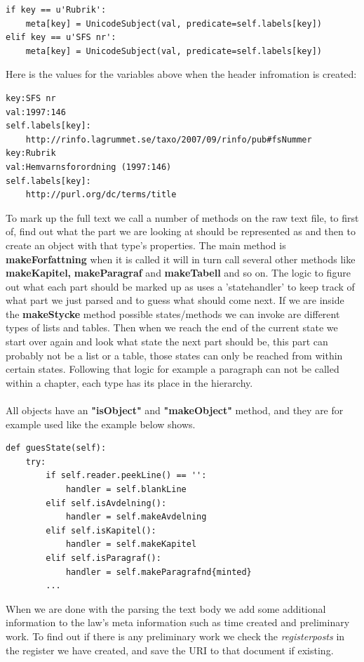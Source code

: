 \begin{verbatim}
if key == u'Rubrik':
	meta[key] = UnicodeSubject(val, predicate=self.labels[key])
elif key == u'SFS nr':
	meta[key] = UnicodeSubject(val, predicate=self.labels[key])
\end{verbatim} 
\linebreak
\newline
Here is the values for the variables above when the header infromation is created:\\
\begin{verbatim}
key:SFS nr
val:1997:146
self.labels[key]:
	http://rinfo.lagrummet.se/taxo/2007/09/rinfo/pub#fsNummer
key:Rubrik
val:Hemvarnsforordning (1997:146)
self.labels[key]:
	http://purl.org/dc/terms/title
\end{verbatim}
\linebreak
\newline
To mark up the full text we call a number of methods on the raw text file, to first of, find out what the part we are looking at should be represented as and then to create an object with that type's properties. The main method is \textbf{makeForfattning} when it is called it will in turn call several other methods like \textbf{makeKapitel,} \textbf{makeParagraf} and \textbf{makeTabell} and so on. The logic to figure out what each part should be marked up as uses a 'statehandler' to keep track of what part we just parsed and to guess what should come next. If we are inside the \textbf{makeStycke} method possible states/methods we can invoke are different types of lists and tables. Then when we reach the end of the current state we start over again and look what state the next part should be, this part can probably not be a list or a table, those states can only be reached from within certain states. Following that logic for example a paragraph can not be called within a chapter, each type has its place in the hierarchy. \\\\
All objects have an \textbf{"isObject"} and \textbf{"makeObject"} method, and they are for example used like the example below shows.\\ 
\begin{verbatim}
def guesState(self):
	try:
		if self.reader.peekLine() == '':
			handler = self.blankLine
		elif self.isAvdelning():
			handler = self.makeAvdelning
		elif self.isKapitel():
			handler = self.makeKapitel
		elif self.isParagraf():
			handler = self.makeParagrafnd{minted}
		...
\end{verbatim}
\linebreak  
\newline
When we are done with the parsing the text body we add some additional information to the law’s meta information such as time created and preliminary work. To find out if there is any preliminary work we check the \textit{registerposts} in the register we have created, and save the URI to that document if existing.

